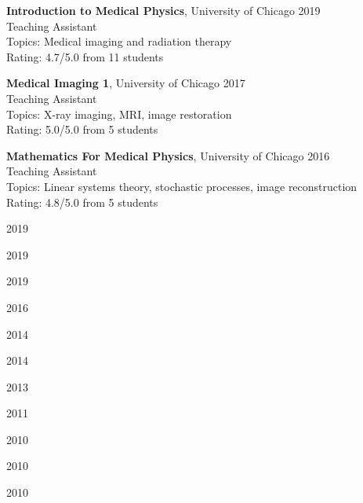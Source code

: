 \documentclass[12pt,letterpaper]{article}
\begin{document}
\begin{benumerate}{3}
\item
  \textbf{Introduction to Medical Physics}, University of Chicago \hfill 2019\\
  Teaching Assistant\\
  Topics: Medical imaging and radiation therapy\\
  Rating: 4.7/5.0 from 11 students
\item
  \textbf{Medical Imaging 1}, University of Chicago \hfill 2017\\
  Teaching Assistant\\
  Topics: X-ray imaging, MRI, image restoration\\
  Rating: 5.0/5.0 from 5 students
\item
  \textbf{Mathematics For Medical Physics}, University of Chicago \hfill 2016\\
  Teaching Assistant\\
  Topics: Linear systems theory, stochastic processes, image reconstruction\\
  Rating: 4.8/5.0 from 5 students
\end{benumerate}

\begin{mybenumerate}{11}
\item {} \hfill{2019}
\item {} \hfill{2019}
\item {} \hfill{2019}
\item {} \hfill{2016}
\item {} \hfill{2014}
\item {} \hfill{2014}
\item {} \hfill{2013}
\item {} \hfill{2011}
\item {} \hfill{2010}
\item {} \hfill{2010}
\item {} \rtab{-}\hfill{2010}
\end{mybenumerate}
\end{document}
